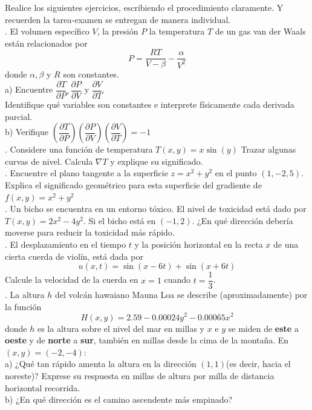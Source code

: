 \documentclass[letterpaper]{article}
\renewcommand{\d}{\partial}
\renewcommand{\*}{\cdot}
\theoremstyle{definition}
\begin{document}
\noindent Realice los siguientes ejercicios, escribiendo el procedimiento claramente. Y recuerden la tarea-examen se entregan de manera individual.\\

. El volumen específico $ V $, la presión $ P $  la temperatura $ T $ de un gas van der Waals están relacionados por
\[ P = \dfrac{RT}{V - \beta} - \dfrac{\alpha}{V^2} \] donde $ \alpha, \beta $ y $ R $ son constantes.\\

a) Encuentre $ \dfrac{\d T}{\d P}, \dfrac{\d P}{\d V} $ y $ \dfrac{\d V}{\d T} $.\\

Identifique qué variables son constantes e interprete físicamente cada derivada parcial.\\

b) Verifique $ \left( \dfrac{\d T}{\d P}\right) \left( \dfrac{\d P}{\d V}\right)\left( \dfrac{\d V}{\d T}\right) = -1 $\\

. Considere una función de temperatura $ T(x,y) = x\sin(y) $ Trazar algunas curvas de nivel. Calcula $ \nabla T $ y explique su significado.\\

. Encuentre el plano tangente a la superficie $ z = x^2 + y^2 $ en el punto $ (1,-2,5) $. Explica el significado geométrico para esta superficie del gradiente de $ f(x,y)= x^2 + y^2 $\\

. Un bicho se encuentra en un entorno tóxico. El nivel de toxicidad está dado por $ T(x,y) = 2x^2 - 4y^2 $. Si el bicho está en $ (-1,2) $. ¿En qué dirección debería moverse para reducir la toxicidad más rápido.\\

. El desplazamiento en el tiempo $ t $ y la posición horizontal en la recta $ x $ de una cierta cuerda de violín, está dada por $$ u(x,t) = \sin(x - 6t) + \sin(x+6t) $$ Calcule la velocidad de la cuerda en $ x = 1 $ cuando $ t = \dfrac{1}{3} $.\\

. La altura $ h $ del volcán hawaiano Mauna Loa se describe (aproximadamente) por la función $$ H(x,y) = 2.59 - 0.00024y^2 - 0.00065x^2 $$donde $ h $ es la altura sobre el nivel del mar en millas y $ x $ e $ y $ se miden de \textbf{este} a \textbf{oeste} y de \textbf{norte} a \textbf{sur}, también en millas desde la cima de la montaña. En $ (x,y) = (-2,-4) $:\\

a) ¿Qué tan rápido amenta la altura en la dirección $ (1,1) $(es decir, hacia el noreste)? Exprese su respuesta en millas de altura por milla de distancia horizontal recorrida.\\

b) ¿En qué dirección es el camino ascendente más empinado?
\end{document}
